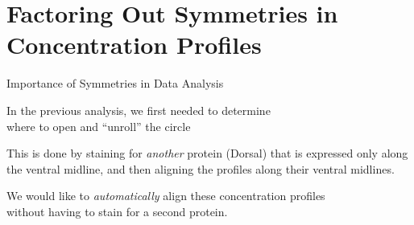 \section[Factoring Out Symmetries in Concentration Profiles]{Factoring Out Symmetries in Concentration Profiles}

\begin{frame}{Importance of Symmetries in Data Analysis}

	\centering
	In the previous analysis, we first needed to determine \\where to open and ``unroll'' the circle
	
	\centering
	
	This is done by staining for {\em another} protein (Dorsal) that is expressed only along the ventral midline, and then aligning the profiles along their ventral midlines.
	
	\vspace{0.2in}
	We would like to {\em automatically} align these concentration profiles\\
	without having to stain for a second protein.

\end{frame}

